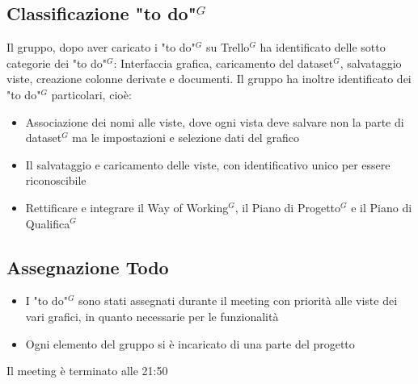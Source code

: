 \subsection{Classificazione "to do"$^{G}$}
Il gruppo, dopo aver caricato i "to do"$^{G}$ su Trello$^{G}$ ha identificato delle sotto categorie dei "to do"$^{G}$:
Interfaccia grafica, caricamento del dataset$^{G}$, salvataggio viste, creazione colonne derivate e documenti. \newline
Il gruppo ha inoltre identificato dei "to do"$^{G}$ particolari, cioè:
\begin{itemize}
	\item Associazione dei nomi alle viste, dove ogni vista deve salvare non la parte di dataset$^{G}$ ma le impostazioni e selezione dati del grafico
	\item Il salvataggio e caricamento delle viste, con identificativo unico per essere riconoscibile 
	\item Rettificare e integrare il Way of Working$^{G}$, il Piano di Progetto$^{G}$ e il Piano di Qualifica$^{G}$
\end{itemize}

\subsection{Assegnazione Todo}
\begin{itemize}
	\item I "to do"$^{G}$ sono stati assegnati durante il meeting con priorità alle viste dei vari grafici, in quanto necessarie per le funzionalità
	\item Ogni elemento del gruppo si è incaricato di una parte del progetto
\end{itemize}

Il meeting è terminato alle 21:50

